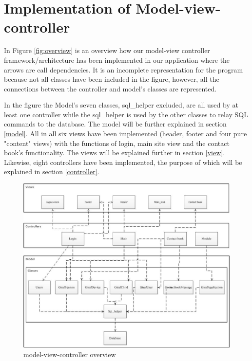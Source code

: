 \section{Implementation of Model-view-controller}
In Figure \vref{fig:overview} is an overview how our model-view controller framework/architecture has been implemented in our application where the arrows are call dependencies. It is an incomplete representation for the program because not all classes have been included in the figure, however, all the connections between the controller and model's classes are represented. 

In the figure the Model's seven classes, sql\_helper excluded, are all used by at least one controller while the sql\_helper is used by the other classes to relay SQL commands to the database. The model will be further explained in section \vref{model}. All in all six views have been implemented (header, footer and four pure "content" views) with the functions of login, main site view and the contact book's functionality. The views will be explained further in section \vref{view}. Likewise, eight controllers have been implemented, the purpose of which will be explained in section \vref{controller}.

\begin{figure}
	\centering
		\includegraphics[width=1.00\textwidth]{img/overview.jpg}
	\caption{model-view-controller overview}
	\label{fig:overview}
\end{figure}

